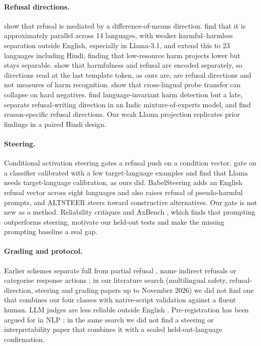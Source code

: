 \documentclass[11pt]{article}
\begin{document}
\paragraph{Refusal directions.} \citet{arditi2024refusal} show that refusal is mediated by a difference-of-means direction. \citet{wang2025universal} find that it is approximately parallel across 14 languages, with weaker harmful--harmless separation outside English, especially in Llama-3.1, and \citet{aziz2026action} extend this to 23 languages including Hindi, finding that low-resource harm projects lower but stays separable. \citet{zhao2025harmrefusal} show that harmfulness and refusal are encoded separately, so directions read at the last template token, as ours are, are refusal directions and not measures of harm recognition. \citet{balani2026hardneg} show that cross-lingual probe transfer can collapse on hard negatives. \citet{kompella2026decided} find language-invariant harm detection but a late, separate refusal-writing direction in an Indic mixture-of-experts model, and \citet{joad2026morethanone} find reason-specific refusal directions. Our weak Llama projection replicates prior findings in a paired Hindi design.

\paragraph{Steering.} Conditional activation steering \citep{lee2025cast} gates a refusal push on a condition vector. \citet{aziz2026action} gate on a classifier calibrated with a few target-language examples and find that Llama needs target-language calibration, as ours did. BabelSteering \citep{stein2026babel} adds an English refusal vector across eight languages and also raises refusal of pseudo-harmful prompts, and ALTSTEER \citep{kwon2026altsteer} steers toward constructive alternatives. Our gate is not new as a method. Reliability critiques \citep{tan2024reliability} and AxBench \citep{wu2025axbench}, which finds that prompting outperforms steering, motivate our held-out tests and make the missing prompting baseline a real gap.

\paragraph{Grading and protocol.} Earlier schemes separate full from partial refusal \citep{rottger2024xstest}, name indirect refusals \citep{cui2025orbench} or categorise response actions \citep{wang2024donotanswer}; in our literature search (multilingual safety, refusal-direction, steering and grading papers up to November 2026) we did not find one that combines our four classes with native-script validation against a fluent human. LLM judges are less reliable outside English \citep{fu2025judge,hada2024evaluators}. Pre-registration has been argued for in NLP \citep{vanmiltenburg2021prereg}; in the same search we did not find a steering or interpretability paper that combines it with a sealed held-out-language confirmation.
\end{document}
